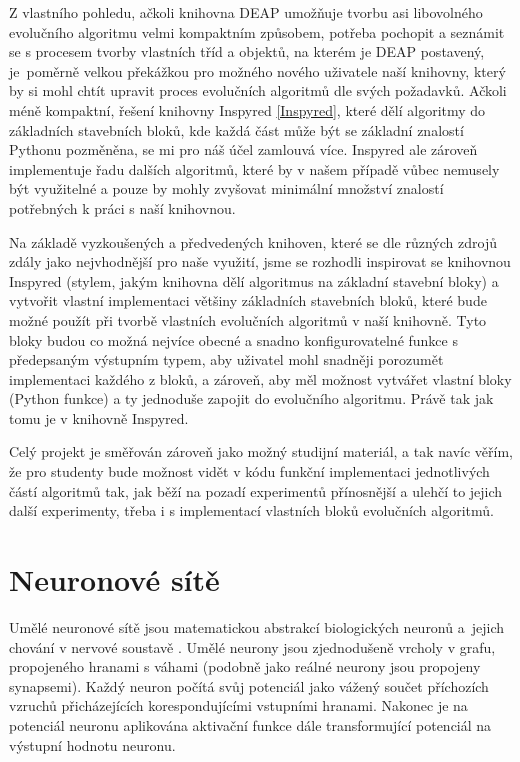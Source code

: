 Z vlastního pohledu, ačkoli knihovna DEAP umožňuje tvorbu asi
libovolného evolučního algoritmu velmi kompaktním způsobem, potřeba pochopit a
seznámit se s procesem tvorby vlastních tříd a objektů, na kterém je DEAP
postavený, je~poměrně velkou překážkou pro možného nového uživatele naší
knihovny, který by si mohl chtít upravit proces evolučních algoritmů dle
svých požadavků. Ačkoli méně kompaktní, řešení knihovny Inspyred
\ref{Inspyred}, které dělí algoritmy do základních stavebních bloků, kde každá
část může být se základní znalostí Pythonu pozměněna, se mi pro náš účel
zamlouvá více. Inspyred ale zároveň implementuje řadu dalších algoritmů, které
by v našem případě vůbec nemusely být využitelné a pouze by mohly zvyšovat
minimální množství znalostí potřebných k práci s naší knihovnou.

Na základě vyzkoušených a předvedených knihoven, které se dle různých zdrojů
\citep{fortin2012deap} zdály jako nejvhodnější pro naše využití, jsme se
rozhodli inspirovat se knihovnou Inspyred (stylem, jakým knihovna dělí
algoritmus na základní stavební bloky) a vytvořit vlastní implementaci většiny
základních stavebních bloků, které bude možné použít při tvorbě vlastních
evolučních algoritmů v naší knihovně. Tyto bloky budou co možná nejvíce obecné
a snadno konfigurovatelné funkce s předepsaným výstupním typem, aby uživatel
mohl snadněji porozumět implementaci každého z bloků, a zároveň, aby měl
možnost vytvářet vlastní bloky (Python funkce) a ty jednoduše zapojit do
evolučního algoritmu. Právě tak jak tomu je v knihovně Inspyred. 

Celý projekt je směřován zároveň jako možný studijní materiál, a tak navíc
věřím, že pro studenty bude možnost vidět v kódu funkční implementaci
jednotlivých částí algoritmů tak, jak běží na pozadí experimentů přínosnější a
ulehčí to jejich další experimenty, třeba i s implementací vlastních bloků
evolučních algoritmů.

\section{Neuronové sítě} \label{NN}
Umělé neuronové sítě jsou matematickou abstrakcí biologických neuronů a~jejich
chování v nervové soustavě \citep{rojas2013neural}. Umělé neurony jsou
zjednodušeně vrcholy v grafu, propojeného hranami s váhami (podobně jako reálné
neurony jsou propojeny synapsemi). Každý neuron počítá svůj potenciál jako
vážený součet příchozích vzruchů přicházejících korespondujícími vstupními
hranami. Nakonec je na potenciál neuronu aplikována aktivační funkce dále
transformující potenciál na výstupní hodnotu neuronu.

